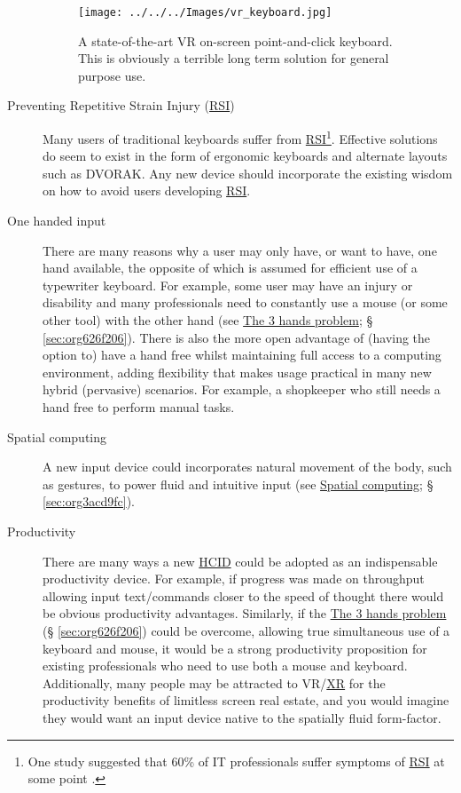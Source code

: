 \documentclass[logo,bsc,singlespacing,parskip]{infthesis}
\begin{document}
\begin{description}
\begin{figure}[h]
\centering
\texttt{[image: ../../../Images/vr\_keyboard.jpg]}
\caption[VR point-and-click on-screen keybaord]{\label{fig:virtual_keyboard}A state-of-the-art VR on-screen point-and-click keyboard. This is obviously a terrible long term solution for general purpose use.}
\end{figure}
\item[{Preventing Repetitive Strain Injury (\hyperref[orgdb95c62]{RSI})}] Many users of traditional keyboards suffer from \hyperref[orgdb95c62]{RSI}\footnote{One study suggested that 60\% of IT professionals suffer symptoms of \hyperref[orgdb95c62]{RSI} at some point \autocite{namayandegiEVALUATIONMETHODWHICH2015}.}.
Effective solutions do seem to exist in the form of ergonomic keyboards and alternate layouts such as DVORAK.
Any new device should incorporate the existing wisdom on how to avoid users developing \hyperref[orgdb95c62]{RSI}.

\item[{One handed input}] There are many reasons why a user may only have, or want to have, one hand available, the opposite of which is assumed for efficient use of a typewriter keyboard.
For example, some user may have an injury or disability and many professionals need to constantly use a mouse (or some other tool) with the other hand (see \hyperref[sec:org626f206]{The 3 hands problem}; § \ref{sec:org626f206}).
There is also the more open advantage of (having the option to) have a hand free whilst maintaining full access to a computing environment, adding flexibility that makes usage practical in many new hybrid (pervasive) scenarios.
For example, a shopkeeper who still needs a hand free to perform manual tasks.

\item[{Spatial computing}] A new input device could incorporates natural movement of the body, such as gestures, to power fluid and intuitive input (see \hyperref[sec:org02f773b]{Spatial computing}; § \ref{sec:org3acd9fc}).

\item[{Productivity}] There are many ways a new \hyperref[orgc00eca5]{HCID} could be adopted as an indispensable productivity device.
For example, if progress was made on throughput allowing input text/commands closer to the speed of thought there would be obvious productivity advantages.
Similarly, if the \hyperref[sec:org626f206]{The 3 hands problem} (§ \ref{sec:org626f206}) could be overcome, allowing true simultaneous use of a keyboard and mouse, it would be a strong productivity proposition for existing professionals who need to use both a mouse and keyboard.
Additionally, many people may be attracted to VR/\hyperref[org1d567af]{XR} for the productivity benefits of limitless screen real estate, and you would imagine they would want an input device native to the spatially fluid form-factor.
\end{description}
\end{document}
